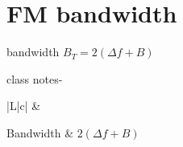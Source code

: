 
\section{FM bandwidth}
\label{sec:fm_bandwidth}

  bandwidth  $B_T = 2(\Delta f + B)$

\begin{warnbox}[\bn{সতর্কতা}]

class notes-

\end{warnbox}

\needspace{82pt}

\begin{tabularx}{\textwidth}{|L|c|}
    \hline
     &
     \\ \hline
\endhead

    Bandwidth &
    $2(\Delta f + B)$ \\ \hline

\caption{FM bandwidth}
\label{tab:fm_bandwidth}
\end{tabularx}
